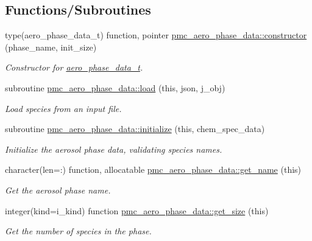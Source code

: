 \subsection*{Functions/\+Subroutines}
\begin{DoxyCompactItemize}
\item 
type(aero\+\_\+phase\+\_\+data\+\_\+t) function, pointer \mbox{\hyperlink{namespacepmc__aero__phase__data_ae2a9e6bfb1747e2ace93ab3fadd55530}{pmc\+\_\+aero\+\_\+phase\+\_\+data\+::constructor}} (phase\+\_\+name, init\+\_\+size)
\begin{DoxyCompactList}\small\item\em Constructor for \mbox{\hyperlink{structpmc__aero__phase__data_1_1aero__phase__data__t}{aero\+\_\+phase\+\_\+data\+\_\+t}}. \end{DoxyCompactList}\item 
subroutine \mbox{\hyperlink{namespacepmc__aero__phase__data_a2210cf15989db48f4c603a91ed23f7ea}{pmc\+\_\+aero\+\_\+phase\+\_\+data\+::load}} (this, json, j\+\_\+obj)
\begin{DoxyCompactList}\small\item\em Load species from an input file. \end{DoxyCompactList}\item 
subroutine \mbox{\hyperlink{namespacepmc__aero__phase__data_a203648cd90bd6eebc09c9f8238122deb}{pmc\+\_\+aero\+\_\+phase\+\_\+data\+::initialize}} (this, chem\+\_\+spec\+\_\+data)
\begin{DoxyCompactList}\small\item\em Initialize the aerosol phase data, validating species names. \end{DoxyCompactList}\item 
character(len=\+:) function, allocatable \mbox{\hyperlink{namespacepmc__aero__phase__data_afdcb4ccd85ae85a97eaf71114c14722f}{pmc\+\_\+aero\+\_\+phase\+\_\+data\+::get\+\_\+name}} (this)
\begin{DoxyCompactList}\small\item\em Get the aerosol phase name. \end{DoxyCompactList}\item 
integer(kind=i\+\_\+kind) function \mbox{\hyperlink{namespacepmc__aero__phase__data_acf59c1ac8fbb92b9d922cc94d4a89571}{pmc\+\_\+aero\+\_\+phase\+\_\+data\+::get\+\_\+size}} (this)
\begin{DoxyCompactList}\small\item\em Get the number of species in the phase. \end{DoxyCompactList}\item 

\end{DoxyCompactItemize}
